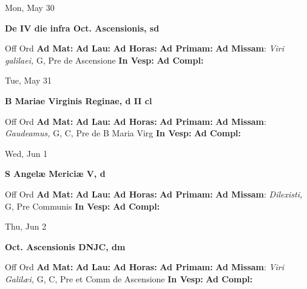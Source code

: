 \documentclass[10pt]{article}
\begin{document}
\begin{minipage}{3.5in}
\vspace{2em}\begin{center}
Mon, May 30
\end{center}\textbf{ \large De IV die infra Oct. Ascensionis, \textnormal{\normalsize sd}}
\begin{justify}
Off Ord
\textbf{Ad Mat: }
\textbf{Ad Lau: }
\textbf{Ad Horas: }
\textbf{Ad Primam: }
\textbf{Ad Missam}: \textit{Viri galilaei,} G, Pre de Ascensione
\textbf{In Vesp: }
\textbf{Ad Compl: }\end{justify}
\end{minipage}



\begin{minipage}{3.5in}
\vspace{2em}\begin{center}
Tue, May 31
\end{center}\textbf{ \large B Mariae Virginis Reginae, \textnormal{\normalsize d II cl}}
\begin{justify}
Off Ord
\textbf{Ad Mat: }
\textbf{Ad Lau: }
\textbf{Ad Horas: }
\textbf{Ad Primam: }
\textbf{Ad Missam}: \textit{Gaudeamus,} G, C, Pre de B Maria Virg
\textbf{In Vesp: }
\textbf{Ad Compl: }\end{justify}
\end{minipage}



\begin{minipage}{3.5in}
\vspace{2em}\begin{center}
Wed, Jun 1
\end{center}\textbf{ \large S Angelæ Mericiæ V, \textnormal{\normalsize d}}
\begin{justify}
Off Ord
\textbf{Ad Mat: }
\textbf{Ad Lau: }
\textbf{Ad Horas: }
\textbf{Ad Primam: }
\textbf{Ad Missam}: \textit{Dilexisti,} G, Pre Communis
\textbf{In Vesp: }
\textbf{Ad Compl: }\end{justify}
\end{minipage}



\begin{minipage}{3.5in}
\vspace{2em}\begin{center}
Thu, Jun 2
\end{center}\textbf{ \large Oct. Ascensionis DNJC, \textnormal{\normalsize dm}}
\begin{justify}
Off Ord
\textbf{Ad Mat: }
\textbf{Ad Lau: }
\textbf{Ad Horas: }
\textbf{Ad Primam: }
\textbf{Ad Missam}: \textit{Viri Galilæi,} G, C, Pre et Comm de Ascensione
\textbf{In Vesp: }
\textbf{Ad Compl: }\end{justify}
\end{minipage}
\end{document}
